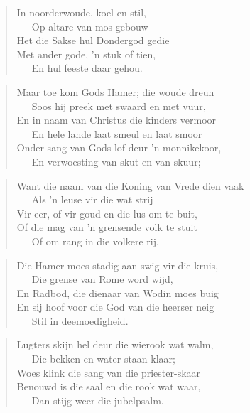 \begin{verse}
In noorderwoude, koel en stil, \\ 
\ \ \ Op altare van mos gebouw \\ 
Het die Sakse hul Dondergod gedie \\ 
Met ander gode, ’n stuk of tien, \\ 
\ \ \ En hul feeste daar gehou. \\ 
\end{verse}

\begin{verse}
Maar toe kom Gods Hamer; die woude dreun \\ 
\ \ \ Soos hij preek met swaard en met vuur, \\ 
En in naam van Christus die kinders vermoor \\ 
\ \ \ En hele lande laat smeul en laat smoor \\ 
Onder sang van Gods lof deur ’n monnikekoor, \\ 
\ \ \ En verwoesting van skut en van skuur; \\ 
\end{verse}

\begin{verse}
Want die naam van die Koning van Vrede dien vaak \\ 
\ \ \ Als ’n leuse vir die wat strij \\ 
Vir eer, of vir goud en die lus om te buit, \\ 
Of die mag van ’n grensende volk te stuit \\ 
\ \ \ Of om rang in die volkere rij. \\ 
\end{verse}

\begin{verse}
Die Hamer moes stadig aan swig vir die kruis, \\ 
\ \ \ Die grense van Rome word wijd, \\ 
En Radbod, die dienaar van Wodin moes buig \\ 
En sij hoof voor die God van die heerser neig \\ 
\ \ \ Stil in deemoedigheid. \\ 
\end{verse}

\begin{verse}
Lugters skijn hel deur die wierook wat walm, \\ 
\ \ \ Die bekken en water staan klaar; \\ 
Woes klink die sang van die priester-skaar \\ 
Benouwd is die saal en die rook wat waar, \\ 
\ \ \ Dan stijg weer die jubelpsalm. \\ 
\end{verse}


